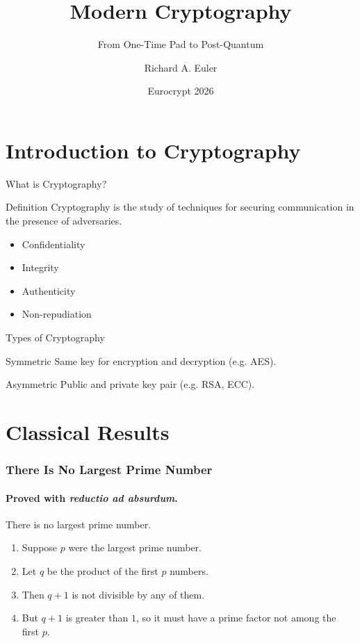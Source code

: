 \documentclass{beamer}
\title[Modern Cryptography]{Modern Cryptography}
\subtitle{From One-Time Pad to Post-Quantum}
\author[N. Surname]{Richard A. Euler}
\institute{Politecnico di Torino}
\date[EC26]{Eurocrypt 2026}
\begin{document}
\begin{frame}
  \titlepage
\end{frame}

\section{Introduction to Cryptography}

\begin{frame}{What is Cryptography?}
\begin{block}{Definition}
Cryptography is the study of techniques for securing communication in the presence of adversaries.
\end{block}

\begin{itemize}
\item<1-> Confidentiality
\item<2-> Integrity
\item<3-> Authenticity
\item<4-> Non-repudiation
\end{itemize}
\end{frame}

\begin{frame}{Types of Cryptography}
\begin{exampleblock}{Symmetric}
Same key for encryption and decryption (e.g. AES).
\end{exampleblock}

\begin{alertblock}{Asymmetric}
Public and private key pair (e.g. RSA, ECC).
\end{alertblock}
\end{frame}

\section{Classical Results}

\begin{frame}
\frametitle{There Is No Largest Prime Number}
\framesubtitle{Proved with \textit{reductio ad absurdum}.} 

\begin{theorem}
There is no largest prime number.
\end{theorem}

\begin{enumerate}
  \item<1-| alert@1> Suppose $p$ were the largest prime number.
  \item<2-> Let $q$ be the product of the first $p$ numbers.
  \item<3-> Then $q+1$ is not divisible by any of them.
  \item<4-> But $q + 1$ is greater than $1$, so it must have a prime factor not among the first $p$.
\end{enumerate}
\end{frame}
\end{document}

